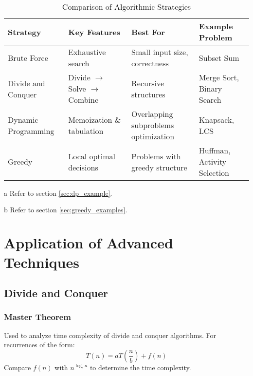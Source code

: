 \documentclass[12pt]{article}
\begin{document}
\begin{table}
    \centering
    \begin{threeparttable}
        \begin{tabular}{@{} l p{3cm} p{4cm} p{3cm} @{}}
            \toprule
            \textbf{Strategy} & \textbf{Key Features} & \textbf{Best For} & \textbf{Example Problem} \\ \midrule
            Brute Force & Exhaustive search & Small input size, correctness & Subset Sum \\
            Divide and Conquer & Divide $\rightarrow$ Solve $\rightarrow$ Combine & Recursive structures & Merge Sort, Binary Search \\
            Dynamic Programming & Memoization \& tabulation & Overlapping subproblems optimization& Knapsack\tnote{a}, LCS \\
            Greedy & Local optimal decisions & Problems with greedy structure & Huffman\tnote{b}, Activity Selection\tnote{b} \\
            \bottomrule
        \end{tabular}
        \begin{tablenotes}
            \footnotesize
            \item[a] Refer to section \ref{sec:dp_example}.
            \item[b] Refer to section \ref{sec:greedy_examples}.
        \end{tablenotes}
    \end{threeparttable}
    \caption{Comparison of Algorithmic Strategies}
    \label{tab:strategies}
\end{table}

\section{Application of Advanced Techniques}
\subsection{Divide and Conquer}

\subsubsection{Master Theorem}
Used to analyze time complexity of divide and conquer algorithms. For recurrences of the form:
\[
T(n) = aT\left(\frac{n}{b}\right) + f(n)
\]
Compare $f(n)$ with $n^{\log_b a}$ to determine the time complexity.
\end{document}
